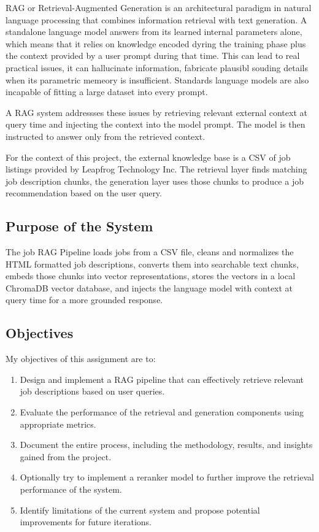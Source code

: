 ﻿\documentclass{article}
\begin{document}
RAG or Retrieval-Augmented Generation is an architectural paradigm in natural language processing that combines information retrieval with text generation.
A standalone language model answers from its learned internal parameters alone, which means that it relies on knowledge encoded dyring the training phase plus the 
context provided by a user prompt during that time. This can lead to real practical issues, it can hallucinate information, fabricate plausibl souding details
when its parametric memeory is insufficient. Standards language models are also incapable of fitting a large dataset into every prompt.

A RAG system addressses these issues by retrieving relevant external context at query time and injecting the context into the model prompt.
The model is then instructed to answer only from the retrieved context.

For the context of this project, the external knowledge base is a CSV of job listings provided by Leapfrog Technology Inc.
The retrieval layer finds matching job description chunks, the generation layer uses those chunks to produce a job recommendation based on the user query.

\subsection{Purpose of the System}

The job RAG Pipeline loads jobs from a CSV file, cleans and normalizes the HTML formatted job descriptions, converts them into searchable text chunks, embeds those chunks into vector representations,
stores the vectors in a local ChromaDB vector database, and injects the language model with context at query time for a more grounded response.
 
\subsection{Objectives}
My objectives of this assignment are to:
\begin{enumerate}
	\item Design and implement a RAG pipeline that can effectively retrieve relevant job descriptions based on user queries.
	\item Evaluate the performance of the retrieval and generation components using appropriate metrics.
	\item Document the entire process, including the methodology, results, and insights gained from the project.
	\item Optionally try to implement a reranker model to further improve the retrieval performance of the system.
	\item Identify limitations of the current system and propose potential improvements for future iterations.
\end{enumerate}
\end{document}
